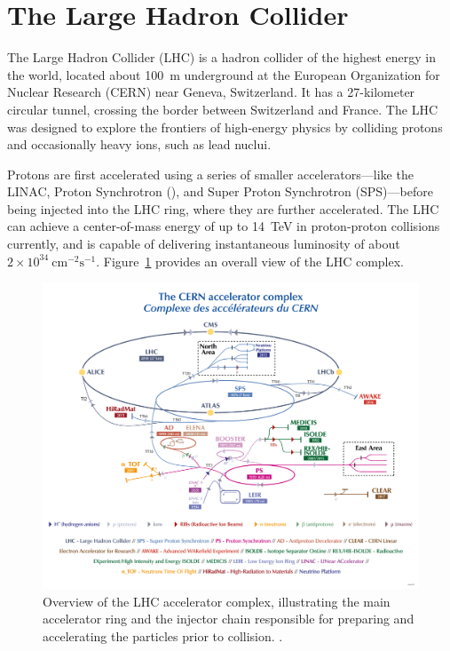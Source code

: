 \section{The Large Hadron Collider} \label{sec:LHC}
The Large Hadron Collider (LHC) is a hadron collider of the highest energy in the world, located about 100~m underground at the European Organization for Nuclear Research (CERN) near Geneva, Switzerland. It has a 27-kilometer circular tunnel, crossing the border between Switzerland and France. The LHC was designed to explore the frontiers of high-energy physics by colliding protons and occasionally heavy ions, such as lead nuclui.

Protons are first accelerated using a series of smaller accelerators—like the LINAC, Proton Synchrotron (\PS), and Super Proton Synchrotron (SPS)—before being injected into the LHC ring, where they are further accelerated. The LHC can achieve a center-of-mass energy of up to 14~TeV in proton-proton collisions currently, and is capable of delivering instantaneous luminosity of about $2 \times 10^{34}~\mathrm{cm}^{-2}\mathrm{s}^{-1}$. Figure~\ref{fig:LHC_complex} provides an overall view of the LHC complex.

\begin{figure}[htbp]
  \centering
  \includegraphics[width=1.0\textwidth]{figs/chapter1/LHC_complex.png}
  \caption{Overview of the LHC accelerator complex, illustrating the main accelerator ring and the injector chain responsible for preparing and accelerating the particles prior to collision. \cite{LHCComplex}.}
  \label{fig:LHC_complex}
\end{figure}

